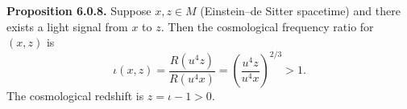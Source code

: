 \textbf{Proposition 6.0.8.} Suppose $x, z \in M$ (Einstein--de Sitter spacetime) and there exists a light signal from $x$ to $z$. Then the cosmological frequency ratio for $(x, z)$ is
$$\iota(x, z) = \frac{R(u^4 z)}{R(u^4 x)} = \left(\frac{u^4 z}{u^4 x}\right)^{2/3} > 1.$$
The cosmological redshift is $z = \iota - 1 > 0$.
